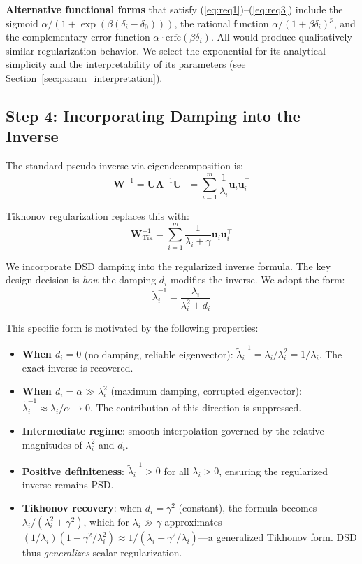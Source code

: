 \documentclass[preprint,review,12pt]{elsarticle}
\begin{document}
\textbf{Alternative functional forms} that satisfy (\ref{eq:req1})--(\ref{eq:req3}) include the sigmoid $\alpha/(1 + \exp(\beta(\delta_i - \delta_0)))$, the rational function $\alpha/(1 + \beta\delta_i)^p$, and the complementary error function $\alpha \cdot \text{erfc}(\beta\delta_i)$. All would produce qualitatively similar regularization behavior. We select the exponential for its analytical simplicity and the interpretability of its parameters (see Section~\ref{sec:param_interpretation}).

\subsection{Step 4: Incorporating Damping into the Inverse}

The standard pseudo-inverse via eigendecomposition is:
\begin{equation}
\bm{W}^{-1} = \bm{U}\bm{\Lambda}^{-1}\bm{U}^\top = \sum_{i=1}^m \frac{1}{\lambda_i} \bm{u}_i \bm{u}_i^\top
\end{equation}

Tikhonov regularization replaces this with:
\begin{equation}
\bm{W}_{\text{Tik}}^{-1} = \sum_{i=1}^m \frac{1}{\lambda_i + \gamma} \bm{u}_i \bm{u}_i^\top
\label{eq:tikhonov_eigen}
\end{equation}

We incorporate DSD damping into the regularized inverse formula. The key design decision is \emph{how} the damping $d_i$ modifies the inverse. We adopt the form:
\begin{equation}
\tilde{\lambda}_i^{-1} = \frac{\lambda_i}{\lambda_i^2 + d_i}
\label{eq:dsd_formula_derived}
\end{equation}

This specific form is motivated by the following properties:

\begin{itemize}
\item \textbf{When $d_i = 0$} (no damping, reliable eigenvector): $\tilde{\lambda}_i^{-1} = \lambda_i / \lambda_i^2 = 1/\lambda_i$. The exact inverse is recovered.
\item \textbf{When $d_i = \alpha \gg \lambda_i^2$} (maximum damping, corrupted eigenvector): $\tilde{\lambda}_i^{-1} \approx \lambda_i / \alpha \to 0$. The contribution of this direction is suppressed.
\item \textbf{Intermediate regime}: smooth interpolation governed by the relative magnitudes of $\lambda_i^2$ and $d_i$.
\item \textbf{Positive definiteness}: $\tilde{\lambda}_i^{-1} > 0$ for all $\lambda_i > 0$, ensuring the regularized inverse remains PSD.
\item \textbf{Tikhonov recovery}: when $d_i = \gamma^2$ (constant), the formula becomes $\lambda_i/(\lambda_i^2 + \gamma^2)$, which for $\lambda_i \gg \gamma$ approximates $(1/\lambda_i)(1 - \gamma^2/\lambda_i^2) \approx 1/(\lambda_i + \gamma^2/\lambda_i)$---a generalized Tikhonov form. DSD thus \emph{generalizes} scalar regularization.
\end{itemize}
\end{document}
